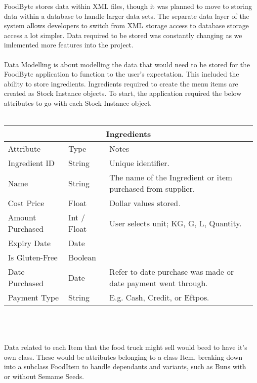 FoodByte stores data within XML files, though it was planned to move to storing data within a database to handle larger data sets. The separate data layer of the system allows developers to switch from XML storage access to database storage access a lot simpler. Data required to be stored was constantly changing as we imlemented more features into the project.
\\ \\
\noindent Data Modelling is about modelling the data that would need to be stored for the FoodByte application to function to the user's expectation. This included the ability to store ingredients. Ingredients required to create the menu items are created as Stock Instance objects. To start, the application required the below attributes to go with each Stock Instance object.
\\ \\
\begin{tabularx}{\linewidth}{|X|X|X|}
\hline
\multicolumn{3}{c}{ Ingredients } \\
\hline
Attribute & Type & Notes \\
\hline
Ingredient ID & String & Unique identifier. \\
\hline
Name & String & The name of the Ingredient or item purchased from supplier. \\
\hline
Cost Price & Float & Dollar values stored. \\
\hline
Amount Purchased & Int / Float & User selects unit; KG, G, L, Quantity. \\
\hline
Expiry Date & Date &   \\
\hline
Is Gluten-Free & Boolean &  \\
\hline
Date Purchased & Date & Refer to date purchase was made or date payment went through. \\
\hline
Payment Type & String & E.g. Cash, Credit, or Eftpos. \\
\hline
\end{tabularx} 
\\ \\ \\
\noindent Data related to each Item that the food truck might sell would beed to have it's own class. These would be attributes belonging to a class Item, breaking down into a subclass FoodItem to handle dependants and variants, such as Buns with or without Semame Seeds.
\\ \\
